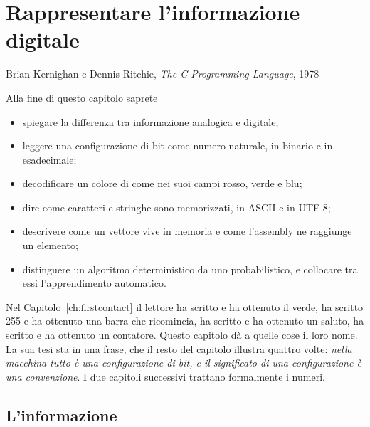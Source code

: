 \chapter{Rappresentare l'informazione digitale}
\label{ch:information}

  {Brian Kernighan e Dennis Ritchie, \emph{The C Programming Language}, 1978}

\begin{chapgoals}
Alla fine di questo capitolo saprete
\begin{itemize}
\item spiegare la differenza tra informazione analogica e digitale;
\item leggere una configurazione di bit come numero naturale, in binario e in esadecimale;
\item decodificare un colore di \prg come  nei suoi campi rosso, verde e blu;
\item dire come caratteri e stringhe sono memorizzati, in ASCII e in UTF-8;
\item descrivere come un vettore vive in memoria e come l'assembly ne raggiunge un elemento;
\item distinguere un algoritmo deterministico da uno probabilistico, e collocare tra essi l'apprendimento automatico.
\end{itemize}
\end{chapgoals}


Nel Capitolo~\ref{ch:firstcontact} il lettore ha scritto  e ha
ottenuto il verde, ha scritto 255 e ha ottenuto una barra che ricomincia, ha
scritto  e ha ottenuto un saluto, ha scritto  e ha
ottenuto un contatore. Questo capitolo dà a quelle cose il loro nome. La sua
tesi sta in una frase, che il resto del capitolo illustra quattro volte:
\emph{nella macchina tutto è una configurazione di bit, e il significato di una
configurazione è una convenzione}. I due capitoli successivi trattano
formalmente i numeri.

\section{L'informazione}

